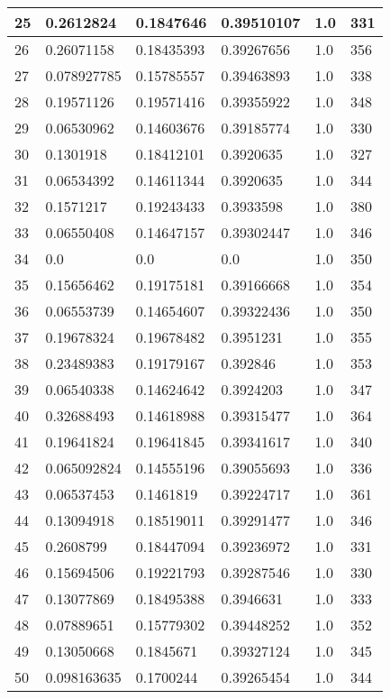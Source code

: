\begin{longtable}{|l|l|l|l|l|l|}
25 & 0.2612824 & 0.1847646 & 0.39510107 & 1.0 & 331 \\ \hline 
26 & 0.26071158 & 0.18435393 & 0.39267656 & 1.0 & 356 \\ \hline 
27 & 0.078927785 & 0.15785557 & 0.39463893 & 1.0 & 338 \\ \hline 
28 & 0.19571126 & 0.19571416 & 0.39355922 & 1.0 & 348 \\ \hline 
29 & 0.06530962 & 0.14603676 & 0.39185774 & 1.0 & 330 \\ \hline 
30 & 0.1301918 & 0.18412101 & 0.3920635 & 1.0 & 327 \\ \hline 
31 & 0.06534392 & 0.14611344 & 0.3920635 & 1.0 & 344 \\ \hline 
32 & 0.1571217 & 0.19243433 & 0.3933598 & 1.0 & 380 \\ \hline 
33 & 0.06550408 & 0.14647157 & 0.39302447 & 1.0 & 346 \\ \hline 
34 & 0.0 & 0.0 & 0.0 & 1.0 & 350 \\ \hline 
35 & 0.15656462 & 0.19175181 & 0.39166668 & 1.0 & 354 \\ \hline 
36 & 0.06553739 & 0.14654607 & 0.39322436 & 1.0 & 350 \\ \hline 
37 & 0.19678324 & 0.19678482 & 0.3951231 & 1.0 & 355 \\ \hline 
38 & 0.23489383 & 0.19179167 & 0.392846 & 1.0 & 353 \\ \hline 
39 & 0.06540338 & 0.14624642 & 0.3924203 & 1.0 & 347 \\ \hline 
40 & 0.32688493 & 0.14618988 & 0.39315477 & 1.0 & 364 \\ \hline 
41 & 0.19641824 & 0.19641845 & 0.39341617 & 1.0 & 340 \\ \hline 
42 & 0.065092824 & 0.14555196 & 0.39055693 & 1.0 & 336 \\ \hline 
43 & 0.06537453 & 0.1461819 & 0.39224717 & 1.0 & 361 \\ \hline 
44 & 0.13094918 & 0.18519011 & 0.39291477 & 1.0 & 346 \\ \hline 
45 & 0.2608799 & 0.18447094 & 0.39236972 & 1.0 & 331 \\ \hline 
46 & 0.15694506 & 0.19221793 & 0.39287546 & 1.0 & 330 \\ \hline 
47 & 0.13077869 & 0.18495388 & 0.3946631 & 1.0 & 333 \\ \hline 
48 & 0.07889651 & 0.15779302 & 0.39448252 & 1.0 & 352 \\ \hline 
49 & 0.13050668 & 0.1845671 & 0.39327124 & 1.0 & 345 \\ \hline 
50 & 0.098163635 & 0.1700244 & 0.39265454 & 1.0 & 344 \\ \hline 
\end{longtable}